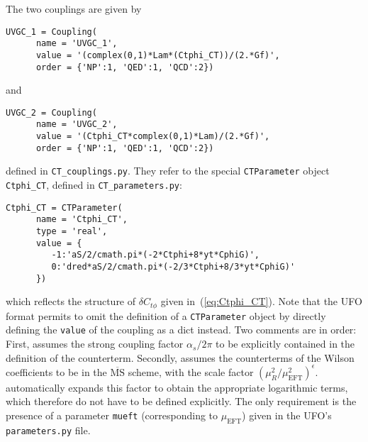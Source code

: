 The two couplings are given by
\begin{lstlisting}[gobble=3,style=py]
   UVGC_1 = Coupling(
      name = 'UVGC_1',
      value = '(complex(0,1)*Lam*(Ctphi_CT))/(2.*Gf)',
      order = {'NP':1, 'QED':1, 'QCD':2})
\end{lstlisting}
and
\begin{lstlisting}[gobble=3,style=py]
   UVGC_2 = Coupling(
      name = 'UVGC_2',
      value = '(Ctphi_CT*complex(0,1)*Lam)/(2.*Gf)',
      order = {'NP':1, 'QED':1, 'QCD':2})
\end{lstlisting}
defined in \texttt{CT\_couplings.py}. They refer to the special \texttt{CTParameter} object \texttt{Ctphi\_CT}, defined in \texttt{CT\_parameters.py}:
\begin{lstlisting}[gobble=3,style=py]
   Ctphi_CT = CTParameter(
      name = 'Ctphi_CT',
      type = 'real',
      value = {
         -1:'aS/2/cmath.pi*(-2*Ctphi+8*yt*CphiG)',
         0:'dred*aS/2/cmath.pi*(-2/3*Ctphi+8/3*yt*CphiG)'
      })
\end{lstlisting}
which reflects the structure of $\delta C_{t\phi}$ given in~(\ref{eq:Ctphi_CT}). Note that the UFO format permits to omit the definition of a \texttt{CTParameter} object by directly defining the \texttt{value} of the coupling as a \python dict instead.
Two comments are in order: First, \gosam assumes the strong coupling factor $\alpha_s/2\pi$ to be explicitly contained in the definition of the counterterm. Secondly, \gosam assumes the counterterms of the Wilson coefficients to be in the $\overline{\text{MS}}$ scheme, with the scale factor $\left(\mu_R^2/\mu_\mathrm{EFT}^2\right)^\epsilon$. \gosam automatically expands this factor to obtain the appropriate logarithmic terms, which therefore do not have to be defined explicitly. The only requirement is the presence of a parameter \texttt{mueft} (corresponding to $\mu_\mathrm{EFT}$) given in the UFO's \texttt{parameters.py} file.